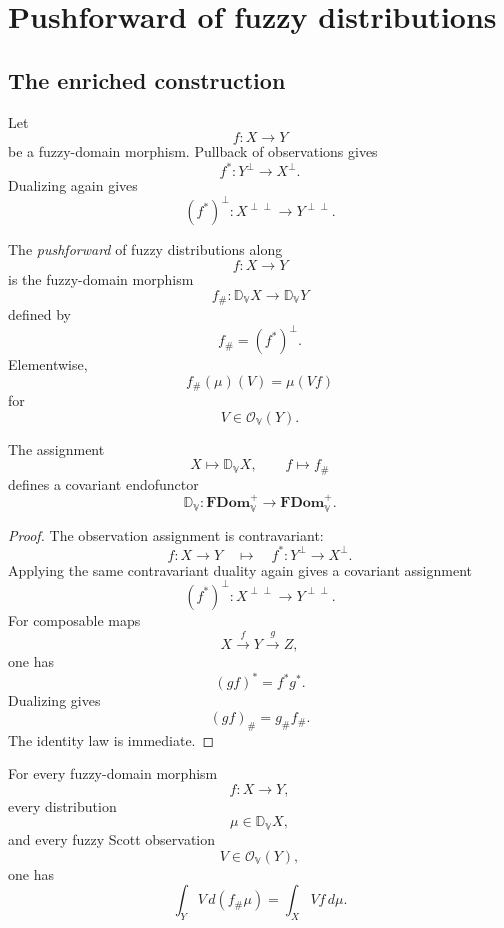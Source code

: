 \section{Pushforward of fuzzy distributions}
\label{sec:pushforward-fuzzy-distributions}

\subsection{The enriched construction}
\label{subsec:pushforward-enriched}

Let
\[
    f:X\to Y
\]
be a fuzzy-domain morphism.  Pullback of observations gives
\[
    f^{\ast}:
    Y^{\perp}\to X^{\perp}.
\]
Dualizing again gives
\[
    (f^{\ast})^{\perp}:
    X^{\perp\perp}\to Y^{\perp\perp}.
\]

\begin{definition}[Pushforward]
\label{def:fuzzy-pushforward}
The \emph{pushforward} of fuzzy distributions along
\[
    f:X\to Y
\]
is the fuzzy-domain morphism
\[
    f_{\#}:
    \mathbb D_{\mathbb V}X\to\mathbb D_{\mathbb V}Y
\]
defined by
\[
    f_{\#}
    =
    (f^{\ast})^{\perp}.
\]
Elementwise,
\[
    f_{\#}(\mu)(V)
    =
    \mu(Vf)
\]
for
\[
    V\in\mathcal O_{\mathbb V}(Y).
\]
\end{definition}

\begin{proposition}
\label{prop:pushforward-functoriality-fuzzy-domain}
The assignment
\[
    X\longmapsto\mathbb D_{\mathbb V}X,
    \qquad
    f\longmapsto f_{\#}
\]
defines a covariant endofunctor
\[
    \mathbb D_{\mathbb V}:
    \mathbf{FDom}_{\mathbb V}^{+}
    \to
    \mathbf{FDom}_{\mathbb V}^{+}.
\]
\end{proposition}

\begin{proof}
The observation assignment is contravariant:
\[
    f:X\to Y
    \quad\mapsto\quad
    f^{\ast}:Y^{\perp}\to X^{\perp}.
\]
Applying the same contravariant duality again gives a covariant assignment
\[
    (f^{\ast})^{\perp}:X^{\perp\perp}\to Y^{\perp\perp}.
\]
For composable maps
\[
    X\xrightarrow{f}Y\xrightarrow{g}Z,
\]
one has
\[
    (gf)^{\ast}=f^{\ast}g^{\ast}.
\]
Dualizing gives
\[
    (gf)_{\#}
    =
    g_{\#}f_{\#}.
\]
The identity law is immediate.
\end{proof}

\begin{proposition}
\label{prop:fuzzy-change-of-variables}
For every fuzzy-domain morphism
\[
    f:X\to Y,
\]
every distribution
\[
    \mu\in\mathbb D_{\mathbb V}X,
\]
and every fuzzy Scott observation
\[
    V\in\mathcal O_{\mathbb V}(Y),
\]
one has
\[
    \int_Y V\,d(f_{\#}\mu)
    =
    \int_X Vf\,d\mu.
\]
\end{proposition}

